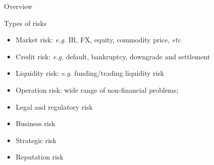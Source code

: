 \begin{frame}[allowframebreaks]{Overview}
\begin{block}{Types of risks}
	\begin{itemize}
		\item Market risk: \textit{e.g.} IR, FX, equity, commodity price, \textit{etc}
		\item Credit risk: \textit{e.g.} default, bankruptcy, downgrade and settlement
		\item Liquidity risk: \textit{e.g.} funding/trading liquidity risk
		\item Operation risk: wide range of non-financial problems; 
		\item Legal and regulatory risk
		\item Business risk
		\item Strategic risk
		\item Reputation risk
	\end{itemize}
\end{block}

\end{frame}